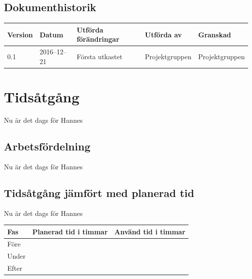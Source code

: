 \documentclass[a4paper,titlepage,12pt]{article}
\begin{document}
\begin{center}
		
		
		\section*{Dokumenthistorik}
		\renewcommand*{\arraystretch}{1.4}
		\begin{longtable}[c]{ l l >{\raggedright}p{5cm} >{\raggedright}p{3cm} l }
			\textbf{Version} & \textbf{Datum} & \textbf{Utförda förändringar} 
			& \textbf{Utförda av} & \textbf{Granskad} \\ \midrule
			
			0.1 & 2016--12--21 & Första utkastet & Projektgruppen &
			Projektgruppen \\
			
		\end{longtable}
	\end{center}
	
	
	\newpage
	
	\raggedright
	
	\section{Tidsåtgång}
	Nu är det dags för Hannes
	
	\subsection{Arbetsfördelning}
	Nu är det dags för Hannes
	
	\subsection{Tidsåtgång jämfört med planerad tid}
	Nu är det dags för Hannes
	
	\begin{longtable}[c]{l l l }
		\textbf{Fas} & \textbf{Planerad tid i timmar} & \textbf{Använd tid i timmar} \\ \midrule
		Före &  &  \\
		Under &  &  \\
		Efter &  &  \\
	\end{longtable}
	
\end{document}
